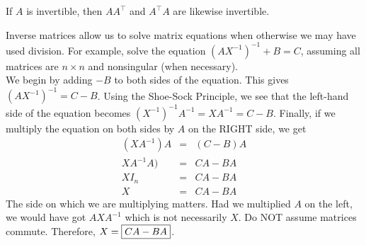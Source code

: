 \begin{Cor}\label{cor:inverseProps} If $A$ is invertible, then $AA^\top $ and $A^\top A$ are likewise invertible.\end{Cor}\vs

\begin{Exam} Inverse matrices allow us to solve matrix equations when otherwise we may have used division. For example, solve the equation $(AX^{-1})^{-1}+B = C$, assuming all matrices are $n\times n$ and nonsingular (when necessary).\\

We begin by adding $-B$ to both sides of the equation. This gives $(AX^{-1})^{-1} = C-B$. Using the Shoe-Sock Principle, we see that the left-hand side of the equation becomes $(X^{-1})^{-1}A^{-1} = XA^{-1} = C-B$. Finally, if we multiply the equation on both sides by $A$ on the RIGHT side, we get
\begin{eqnarray*}
(XA^{-1})A &=& (C-B)A\\
XA^{-1}A) &=& CA-BA\\
XI_n &=& CA-BA\\
X&=& CA-BA
\end{eqnarray*} The side on which we are multiplying matters. Had we multiplied $A$ on the left, we would have got $AXA^{-1}$ which is not necessarily $X$. Do NOT assume matrices commute. Therefore, $X=\fbox{$CA-BA$}$.
\end{Exam}\vs


